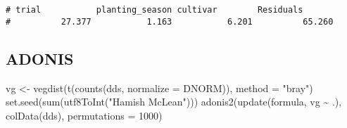 \documentclass[
]{article}
\newenvironment{Shaded}{\begin{snugshade}}{\end{snugshade}}
\newcommand{\AttributeTok}[1]{\textcolor[rgb]{0.77,0.63,0.00}{#1}}
\newcommand{\CommentTok}[1]{\textcolor[rgb]{0.56,0.35,0.01}{\textit{#1}}}
\newcommand{\ControlFlowTok}[1]{\textcolor[rgb]{0.13,0.29,0.53}{\textbf{#1}}}
\newcommand{\DecValTok}[1]{\textcolor[rgb]{0.00,0.00,0.81}{#1}}
\newcommand{\FunctionTok}[1]{\textcolor[rgb]{0.00,0.00,0.00}{#1}}
\newcommand{\NormalTok}[1]{#1}
\newcommand{\OtherTok}[1]{\textcolor[rgb]{0.56,0.35,0.01}{#1}}
\newcommand{\SpecialCharTok}[1]{\textcolor[rgb]{0.00,0.00,0.00}{#1}}
\newcommand{\StringTok}[1]{\textcolor[rgb]{0.31,0.60,0.02}{#1}}
\begin{document}
\begin{Shaded}
\end{Shaded}

\begin{verbatim}
# trial           planting_season cultivar        Residuals       
#          27.377           1.163           6.201          65.260
\end{verbatim}

\hypertarget{adonis-1}{%
\subsection{ADONIS}\label{adonis-1}}

\begin{Shaded}
\begin{Highlighting}[]
\NormalTok{vg }\OtherTok{\textless{}{-}} \FunctionTok{vegdist}\NormalTok{(}\FunctionTok{t}\NormalTok{(}\FunctionTok{counts}\NormalTok{(dds, }\AttributeTok{normalize =}\NormalTok{ DNORM)), }\AttributeTok{method =} \StringTok{"bray"}\NormalTok{)}
\FunctionTok{set.seed}\NormalTok{(}\FunctionTok{sum}\NormalTok{(}\FunctionTok{utf8ToInt}\NormalTok{(}\StringTok{"Hamish McLean"}\NormalTok{)))}
\FunctionTok{adonis2}\NormalTok{(}\FunctionTok{update}\NormalTok{(formula, vg }\SpecialCharTok{\textasciitilde{}}\NormalTok{ .), }\FunctionTok{colData}\NormalTok{(dds), }\AttributeTok{permutations =} \DecValTok{1000}\NormalTok{)}
\end{Highlighting}
\end{Shaded}
\end{document}
